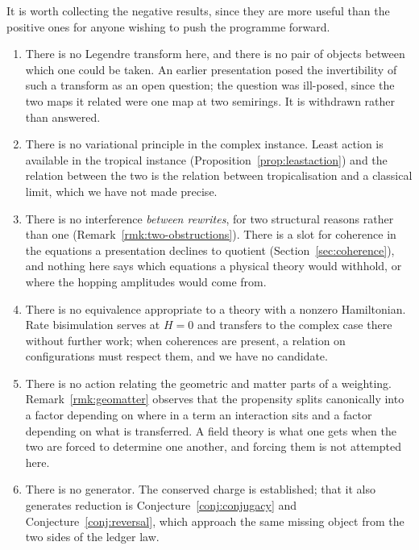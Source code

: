 It is worth collecting the negative results, since they are more useful
than the positive ones for anyone wishing to push the programme forward.

\begin{enumerate}[itemsep=4pt]
  \item There is no Legendre transform here, and there is no pair of
        objects between which one could be taken.  An earlier presentation
        posed the invertibility of such a transform as an open question;
        the question was ill-posed, since the two maps it related were one
        map at two semirings.  It is withdrawn rather than answered.

  \item There is no variational principle in the complex instance.  Least
        action is available in the tropical instance
        (Proposition~\ref{prop:leastaction}) and the relation between the
        two is the relation between tropicalisation and a classical limit,
        which we have not made precise.

  \item There is no interference \emph{between rewrites}, for two
        structural reasons rather than one
        (Remark~\ref{rmk:two-obstructions}).  There is a slot for
        coherence in the equations a presentation declines to quotient
        (Section~\ref{sec:coherence}), and nothing here says which
        equations a physical theory would withhold, or where the hopping
        amplitudes would come from.

  \item There is no equivalence appropriate to a theory with a nonzero
        Hamiltonian.  Rate bisimulation serves at $H = 0$ and transfers to
        the complex case there without further work; when coherences are
        present, a relation on configurations must respect them, and we
        have no candidate.

  \item There is no action relating the geometric and matter parts of a
        weighting.  Remark~\ref{rmk:geomatter} observes that the
        propensity splits canonically into a factor depending on where in
        a term an interaction sits and a factor depending on what is
        transferred.  A field theory is what one gets when the two are
        forced to determine one another, and forcing them is not
        attempted here.

  \item There is no generator.  The conserved charge is established; that
        it also generates reduction is Conjecture~\ref{conj:conjugacy} and
        Conjecture~\ref{conj:reversal}, which approach the same missing
        object from the two sides of the ledger law.
\end{enumerate}

